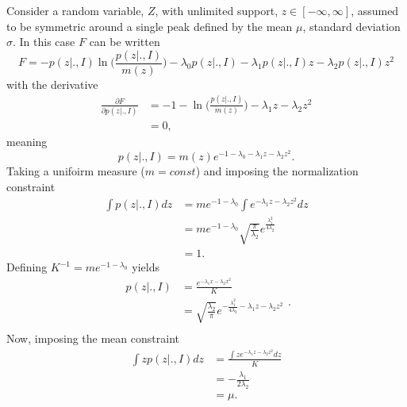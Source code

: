 \begin{example}
	Consider a random variable, $Z$, with unlimited support, $z\in [-\infty,\infty]$, assumed to be symmetric around a single peak defined by the mean $\mu$, standard deviation $\sigma$. In this case $F$ can be written\label{ex:gauss}
	\begin{equation}
		F = -p(z|.,I)\ln\bigg(\frac{p(z|.,I)}{m(z)}\bigg)-\lambda_0p(z|.,I)-\lambda_1p(z|.,I)z-\lambda_2p(z|.,I)z^2
	\end{equation}
	with the derivative
	\begin{equation}
		\begin{split}
			\frac{\partial F}{\partial p(z|.,I)} &= -1-\ln\bigg(\frac{p(z|.,I)}{m(z)}\bigg)-\lambda_1z-\lambda_2z^2\\
			&=0,
		\end{split}
	\end{equation}
	meaning
	\begin{equation}
		p(z|.,I)=m(z)e^{-1-\lambda_0-\lambda_1z-\lambda_2z^2}.
	\end{equation}
	Taking a unifoirm measure ($m= const$) and imposing the normalization constraint
	\begin{equation}
		\begin{split}
			\int p(z|.,I) dz &= me^{-1-\lambda_0}\int e^{-\lambda_1z-\lambda_2z^2}dz\\
			&= me^{-1-\lambda_0}\sqrt{\frac{\pi}{\lambda_2}}e^{\frac{\lambda_1^2}{4\lambda_2}}\\
			&=1.
		\end{split}
	\end{equation}
	Defining $K^{-1} = me^{-1-\lambda_0}$ yields
	\begin{equation}
		\begin{split}
			p(z|.,I) &= \frac{e^{-\lambda_1x-\lambda_2x^2}}{K}\\
			&= \sqrt{\frac{\lambda_2}{\pi}}e^{-\frac{\lambda_1^2}{4\lambda_2}-\lambda_1z-\lambda_2z^2}\\
		\end{split}.
	\end{equation}
	Now, imposing the mean constraint
	\begin{equation}
		\begin{split}
			\int zp(z|.,I) dz &= \frac{\int ze^{-\lambda_1z-\lambda_2z^2}dz}{K}\\
			&= -\frac{\lambda_1}{2\lambda_2}\\
			&=\mu.
		\end{split}

\end{equation}
\end{example}
